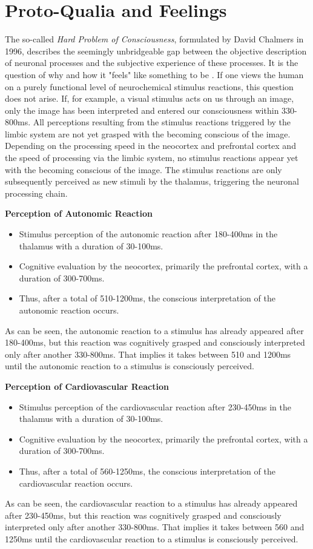 \section*{Proto-Qualia and Feelings}
The so-called \emph{Hard Problem of Consciousness}, formulated by David Chalmers in 1996, describes the seemingly unbridgeable gap between the objective description of neuronal processes and the subjective experience of these processes.
It is the question of why and how it "feels" like something to be \cite{Chalmers1996}.
If one views the human on a purely functional level of neurochemical stimulus reactions, this question does not arise.
If, for example, a visual stimulus acts on us through an image, only the image has been interpreted and entered our consciousness within 330-800ms.
All perceptions resulting from the stimulus reactions triggered by the limbic system are not yet grasped with the becoming conscious of the image.
Depending on the processing speed in the neocortex and prefrontal cortex and the speed of processing via the limbic system, no stimulus reactions appear yet with the becoming conscious of the image.
The stimulus reactions are only subsequently perceived as new stimuli by the thalamus, triggering the neuronal processing chain.

\textbf{Perception of Autonomic Reaction}
\begin{itemize}
    \item Stimulus perception of the autonomic reaction after 180-400ms in the thalamus with a duration of 30-100ms.
    \item Cognitive evaluation by the neocortex, primarily the prefrontal cortex, with a duration of 300-700ms.
    \item Thus, after a total of 510-1200ms, the conscious interpretation of the autonomic reaction occurs.
\end{itemize}
As can be seen, the autonomic reaction to a stimulus has already appeared after 180-400ms, but this reaction was cognitively grasped and consciously interpreted only after another 330-800ms.
That implies it takes between 510 and 1200ms until the autonomic reaction to a stimulus is consciously perceived.

\textbf{Perception of Cardiovascular Reaction}
\begin{itemize}
    \item Stimulus perception of the cardiovascular reaction after 230-450ms in the thalamus with a duration of 30-100ms.
    \item Cognitive evaluation by the neocortex, primarily the prefrontal cortex, with a duration of 300-700ms.
    \item Thus, after a total of 560-1250ms, the conscious interpretation of the cardiovascular reaction occurs.
\end{itemize}
As can be seen, the cardiovascular reaction to a stimulus has already appeared after 230-450ms, but this reaction was cognitively grasped and consciously interpreted only after another 330-800ms.
That implies it takes between 560 and 1250ms until the cardiovascular reaction to a stimulus is consciously perceived.

